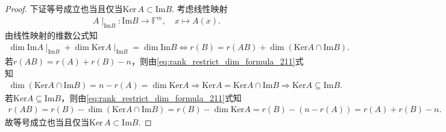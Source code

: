 \documentclass[../../main.tex]{subfiles}%
\begin{document}
\begin{proof}
下证等号成立也当且仅当$\text{Ker}\,A\subset \text{Im}B$.
考虑线性映射
\begin{align*}
A\mid_{\mathrm{Im}B}: \mathrm{Im}B \to \mathbb{F}^m, \quad x \mapsto A(x).
\end{align*}
由线性映射的维数公式知
\begin{align}
\dim \mathrm{Im}A\mid_{\mathrm{Im}B} + \dim \mathrm{Ker}A\mid_{\mathrm{Im}B} = \dim \mathrm{Im}B \Longleftrightarrow r(B) = r(AB) + \dim(\mathrm{Ker}A \cap \mathrm{Im}B).
\label{eq:rank_restrict_dim_formula_211}
\end{align}
若$r(AB) = r(A) + r(B) - n$，则由\eqref{eq:rank_restrict_dim_formula_211}式知
\begin{align*}
\dim(\mathrm{Ker}A \cap \mathrm{Im}B) = n - r(A) = \dim \mathrm{Ker}A \Longrightarrow \mathrm{Ker}A = \mathrm{Ker}A \cap \mathrm{Im}B \Longrightarrow \mathrm{Ker}A \subseteq \mathrm{Im}B.
\end{align*}
若$\mathrm{Ker}A \subseteq \mathrm{Im}B$，则由\eqref{eq:rank_restrict_dim_formula_211}式知
\begin{align*}
r(AB) = r(B) - \dim(\mathrm{Ker}A \cap \mathrm{Im}B) = r(B) - \dim \mathrm{Ker}A = r(B) - (n - r(A)) = r(A) + r(B) - n.
\end{align*}
故等号成立也当且仅当$\text{Ker}\,A\subset \text{Im}B$.
\end{proof}
\end{document}

